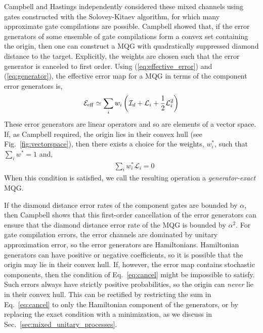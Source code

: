 \documentclass[aps,nofootinbib,pra,notitlepage,twocolumn]{revtex4-1}
\newcommand{\errmat}{\ensuremath{{\mathcal{E}}}}
\newcommand{\genmat}{\ensuremath{{\mathcal{L}}}}
\newcommand{\identmat}{\ensuremath{\mathcal{I}}}
\newcommand{\0}{\ensuremath{\mathbf{0}}}
\newcommand{\weight}{\ensuremath{w}}
\begin{document}
Campbell \cite{Campbell2017} and Hastings \cite{1612.01011} independently considered these mixed channels using gates constructed with the Solovey-Kitaev algorithm, for which many approximate gate compilations are possible. Campbell showed that, if the error generators of some ensemble of gate compilations form a convex set containing the origin, then one can construct a MQG with quadratically suppressed diamond distance to the target. Explicitly, the weights are chosen such that the error generator is canceled to first order. Using (\ref{eq:effective_error}) and (\ref{eq:generator}), the effective error map for a MQG in terms of the component error generators is,
\begin{align}
	\label{eq:generators_and_effective_error}
	\errmat_{\rm eff} \simeq \sum_i \weight_i \left(\identmat_d + \genmat_i + \frac{1}{2}  \genmat_i^2\right)
\end{align}
These error generators are linear operators and so are elements of a vector space. If, as Campbell required, the origin lies in their convex hull (see Fig.~\ref{fig:vectorspace}), then there exists a choice for the weights, $\weight_i^*$, such that $\sum_i \weight^*=1$ and,
\begin{align}
	\label{eq:cancel}
	&\sum_i \weight_i^* \genmat_i= 0
\end{align}
When this condition is satisfied, we call the resulting operation a \emph{generator-exact} MQG. 

If the diamond distance error rates of the component gates are bounded by $\alpha$, then Campbell shows that this first-order cancellation of the error generators can ensure that the diamond distance error rate of the MQG is bounded by $\alpha^2$. For gate compilation errors, the error channels are dominated by unitary approximation error, so the error generators are Hamiltonians. Hamiltonian generators can have positive or negative coefficients, so it is possible that the origin may lie in their convex hull. If, however, the error map contains stochastic components, then the condition of Eq.~\eqref{eq:cancel} might be impossible to satisfy. Such errors always have strictly positive probabilities, so the origin can \emph{never} lie in their convex hull. This can be rectified by restricting the sum in Eq.~\eqref{eq:cancel} to only the Hamiltonian component of the generators, or by replacing the exact condition with a minimization, as we discuss in Sec.~\ref{sec:mixed_unitary_processes}. 
\end{document}
